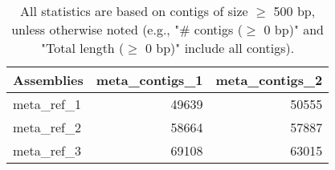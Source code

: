 \documentclass[12pt,a4paper]{article}
\begin{document}
\begin{table}[ht]
\begin{center}
\caption{All statistics are based on contigs of size $\geq$ 500 bp, unless otherwise noted (e.g., "\# contigs ($\geq$ 0 bp)" and "Total length ($\geq$ 0 bp)" include all contigs).}
\begin{tabular}{|l*{2}{|r}|}
\hline
Assemblies & meta\_contigs\_1 & meta\_contigs\_2 \\ \hline
meta\_ref\_1 & 49639 & 50555 \\ \hline
meta\_ref\_2 & 58664 & 57887 \\ \hline
meta\_ref\_3 & 69108 & 63015 \\ \hline
\end{tabular}
\end{center}
\end{table}
\end{document}
